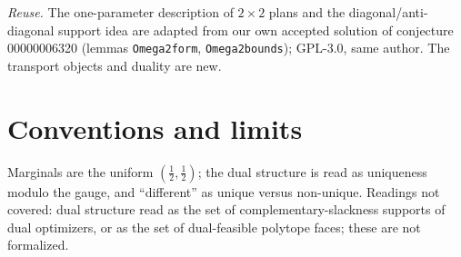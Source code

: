 \documentclass[11pt]{article}
\renewcommand{\_}{\oldus\allowbreak}
\theoremstyle{definition}
\theoremstyle{remark}
\begin{document}
\emph{Reuse.} The one-parameter description of $2\times2$ plans and the diagonal/anti-diagonal support idea are
adapted from our own accepted solution of conjecture 00000006320 (lemmas \texttt{Omega2\_form},
\texttt{Omega2\_bounds}); GPL-3.0, same author. The transport objects and duality are new.

\section{Conventions and limits}
Marginals are the uniform $(\tfrac12,\tfrac12)$; the dual structure is read as uniqueness modulo the gauge, and
``different'' as unique versus non-unique. Readings not covered: dual structure read as the set of complementary-slackness
supports of dual optimizers, or as the set of dual-feasible polytope faces; these are not formalized.
\end{document}
